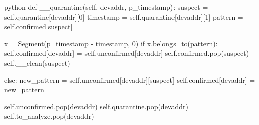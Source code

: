 \begin{mintedbox}{python}
def __quarantine(self, devaddr, p_timestamp):
    suspect = self.quarantine[devaddr][0]
    timestamp = self.quarantine[devaddr][1]
    pattern = self.confirmed[suspect]

    x = Segment(p_timestamp - timestamp, 0)
    if x.belongs_to(pattern):
        self.confirmed[devaddr] = self.unconfirmed[devaddr]
        self.confirmed.pop(suspect)
        self.__clean(suspect)

    else:
        new_pattern = self.unconfirmed[devaddr][suspect]
        self.confirmed[devaddr] = new_pattern

    self.unconfirmed.pop(devaddr)
    self.quarantine.pop(devaddr)
    self.to_analyze.pop(devaddr)
\end{mintedbox}